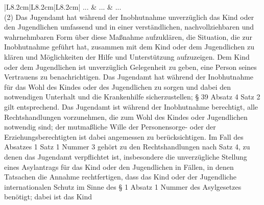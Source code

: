 \documentclass[10pt,a4paper,landscape]{article}
\begin{document}
\begin{longtable}{|L{8.2cm}|L{8.2cm}|L{8.2cm}|}
\hhline{|---|}
... & ... & ... \\
\hhline{|---|}
(2) Das Jugendamt hat während der  \newline Inobhutnahme unverzüglich das Kind oder  \newline den Jugendlichen umfassend und in einer  \newline verständlichen, nachvollziehbaren und  \newline wahrnehmbaren Form über diese  \newline Maßnahme aufzuklären, die Situation, die  \newline zur Inobhutnahme geführt hat, zusammen  \newline mit dem Kind oder dem Jugendlichen zu  \newline klären und Möglichkeiten der Hilfe und  \newline Unterstützung aufzuzeigen. Dem Kind oder  \newline dem Jugendlichen ist unverzüglich  \newline Gelegenheit zu geben, eine Person seines  \newline Vertrauens zu benachrichtigen. Das  \newline Jugendamt hat während der Inobhutnahme  für das Wohl des Kindes oder des  \newline Jugendlichen zu sorgen und dabei den  \newline notwendigen Unterhalt und die  \newline Krankenhilfe sicherzustellen; \S{} \textcolor{diffred}{39} Absatz 4  \newline Satz 2 gilt entsprechend. Das Jugendamt  \newline ist während der Inobhutnahme berechtigt,  \newline alle Rechtshandlungen vorzunehmen, die  \newline zum Wohl des Kindes oder Jugendlichen  \newline notwendig sind; der mutmaßliche Wille der  \newline Personensorge- oder der  \newline Erziehungsberechtigten ist dabei  \newline angemessen zu berücksichtigen. Im Fall  \newline des Absatzes 1 Satz 1 Nummer 3 gehört  \newline zu den Rechtshandlungen nach Satz 4, zu  \newline denen das Jugendamt verpflichtet ist,  \newline insbesondere die unverzügliche Stellung  \newline eines Asylantrags für das Kind oder den  \newline Jugendlichen in Fällen, in denen Tatsachen  \newline die Annahme rechtfertigen, dass das Kind  \newline oder der Jugendliche internationalen  \newline Schutz im Sinne des \S{} 1 Absatz 1 Nummer   des Asylgesetzes benötigt; dabei ist das  \newline Kind 
\end{longtable}
\end{document}
